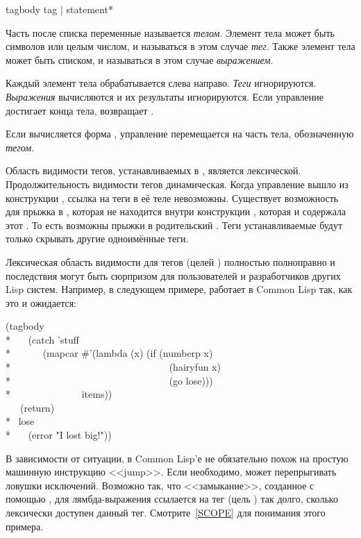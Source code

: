 \begin{defspec}
tagbody {tag | statement}*

Часть  после списка переменные называется \emph{телом}.
Элемент тела может быть символов или целым числом, и называться в этом случае
\emph{тег}. Также элемент тела может быть списком, и называться в этом случае
\emph{выражением}.

Каждый элемент тела обрабатывается слева направо.
\emph{Теги} игнорируются. \emph{Выражения} вычисляются и их результаты
игнорируются. Если управление достигает конца тела,  возвращает
{\false}.

Если вычисляется форма , управление перемещается на часть
тела, обозначенную \emph{тегом}.

Область видимости тегов, устанавливаемых в , является лексической. 
Продолжительность видимости тегов динамическая. Когда управление вышло из
конструкции , ссылка  на теги в её теле невозможны.
Существует возможность для  прыжка в , которая не находится
внутри конструкции , которая и содержала этот . То есть
возможны прыжки в родительский .
Теги устанавливаемые  будут только скрывать другие одноимённые
теги.

Лексическая область видимости для тегов (целей ) полностью полноправно и
последствия могут быть сюрпризом для пользователей и разработчиков других Lisp
систем.
Например,  в следующем примере, работает в Common Lisp так, как это и
ожидается:
\begin{lisp}
(tagbody \\*
~~~(catch 'stuff \\*
~~~~~~(mapcar \#'(lambda (x) (if (numberp x) \\*
~~~~~~~~~~~~~~~~~~~~~~~~~~~~~~~~(hairyfun x) \\*
~~~~~~~~~~~~~~~~~~~~~~~~~~~~~~~~(go lose))) \\*
~~~~~~~~~~~~~~items)) \\
~~~(return) \\*
~lose \\*
~~~(error "I lost big!"))
\end{lisp}
В зависимости от ситуации,  в Common Lisp'е не обязательно похож на
простую машинную инструкцию <<jump>>. Если необходимо,  может
перепрыгивать ловушки исключений. Возможно так, что <<замыкание>>, созданное с
помощью , для лямбда-выражения ссылается на тег (цель )
так долго, сколько лексически доступен данный тег. Смотрите~\ref{SCOPE} для
понимания этого примера.
\end{defspec}

